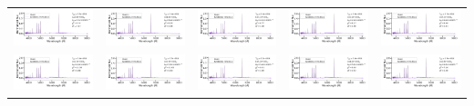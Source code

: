 \begin{center}
\begin{longtable}{l l l l l }
    \includegraphics[width=0.19\linewidth, clip]{model_120000_37.35_3.74.pdf} & \includegraphics[width=0.19\linewidth, clip]{model_140000_37.25_3.78.pdf} & \includegraphics[width=0.19\linewidth, clip]{model_140000_37.08_3.65.pdf} & \includegraphics[width=0.19\linewidth, clip]{model_160000_36.58_3.30.pdf} & \includegraphics[width=0.19\linewidth, clip]{model_130000_37.08_3.60.pdf} \\
    \includegraphics[width=0.19\linewidth, clip]{model_140000_36.70_3.30.pdf} & \includegraphics[width=0.19\linewidth, clip]{model_170000_36.86_3.54.pdf} & \includegraphics[width=0.19\linewidth, clip]{model_120000_37.30_3.70.pdf} & \includegraphics[width=0.19\linewidth, clip]{model_140000_37.19_3.74.pdf} & \includegraphics[width=0.19\linewidth, clip]{model_150000_37.03_3.65.pdf} \\

\end{longtable}
\end{center}
